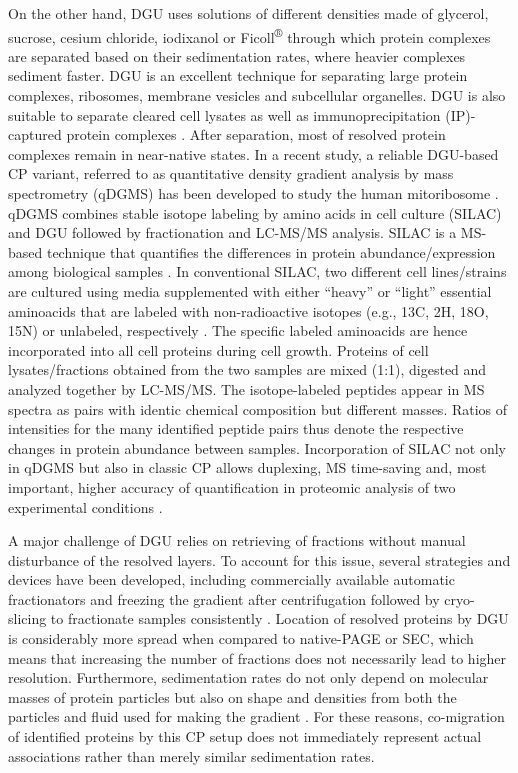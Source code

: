 On the other hand, DGU uses solutions of different densities made of glycerol, sucrose, cesium chloride, iodixanol or Ficoll\textsuperscript{®} through which protein complexes are separated based on their sedimentation rates, where heavier complexes sediment faster. DGU is an excellent technique for separating large protein complexes, ribosomes, membrane vesicles and subcellular organelles. DGU is also suitable to separate cleared cell lysates as well as immunoprecipitation (IP)-captured protein complexes \cite{Caudron-Herger_2019, Lee_2013}. After separation, most of resolved protein complexes remain in near-native states. In a recent study, a reliable DGU-based CP variant, referred to as quantitative density gradient analysis by mass spectrometry (qDGMS) has been developed to study the human mitoribosome \cite{Palenikova_2021a}. qDGMS combines stable isotope labeling by amino acids in cell culture (SILAC) and DGU followed by fractionation and LC-MS/MS analysis. SILAC is a MS-based technique that quantifies the differences in protein abundance/expression among biological samples \cite{Ong_2002}. In conventional SILAC, two different cell lines/strains are cultured using media supplemented with either “heavy” or “light” essential aminoacids that are labeled with non-radioactive isotopes (e.g., 13C, 2H, 18O, 15N) or unlabeled, respectively \cite{Geiger_2011}. The specific labeled aminoacids are hence incorporated into all cell proteins during cell growth. Proteins of cell lysates/fractions obtained from the two samples are mixed (1:1), digested and analyzed together by LC-MS/MS. The isotope-labeled peptides appear in MS spectra as pairs with identic chemical composition but different masses. Ratios of intensities for the many identified peptide pairs thus denote the respective changes in protein abundance between samples. Incorporation of SILAC not only in qDGMS but also in classic CP allows duplexing, MS time-saving and, most important, higher accuracy of quantification in proteomic analysis of two experimental conditions \cite{Palenikova_2021a, Palenikova_2021b}.

A major challenge of DGU relies on retrieving of fractions without manual disturbance of the resolved layers. To account for this issue, several strategies and devices have been developed, including commercially available automatic fractionators and freezing the gradient after centrifugation followed by cryo-slicing to fractionate samples consistently \cite{Yu_2016}. Location of resolved proteins by DGU is considerably more spread when compared to native-PAGE or SEC, which means that increasing the number of fractions does not necessarily lead to higher resolution. Furthermore, sedimentation rates do not only depend on molecular masses of protein particles but also on shape and densities from both the particles and fluid used for making the gradient \cite{Cole_2008}. For these reasons, co-migration of identified proteins by this CP setup does not immediately represent actual associations rather than merely similar sedimentation rates.
%
